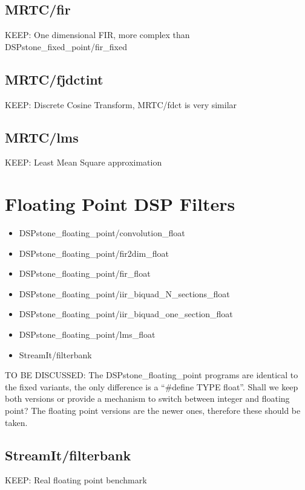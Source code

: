 \documentclass[a4paper]{article}
\begin{document}
\subsection{MRTC/fir}
	KEEP: One dimensional FIR, more complex than DSPstone\_fixed\_point/fir\_fixed
\subsection{MRTC/fjdctint}
	KEEP: Discrete Cosine Transform, MRTC/fdct is very similar
\subsection{MRTC/lms}
	KEEP: Least Mean Square approximation




\section{Floating Point DSP Filters}

\begin{itemize}
	\item DSPstone\_floating\_point/convolution\_float
	\item DSPstone\_floating\_point/fir2dim\_float
	\item DSPstone\_floating\_point/fir\_float
	\item DSPstone\_floating\_point/iir\_biquad\_N\_sections\_float
	\item DSPstone\_floating\_point/iir\_biquad\_one\_section\_float
	\item DSPstone\_floating\_point/lms\_float
	\item StreamIt/filterbank
\end{itemize}
	TO BE DISCUSSED: The DSPstone\_floating\_point programs are identical to
	the fixed variants, the only difference is a ``\#define TYPE float''.
	Shall we keep both versions or provide a mechanism to switch between
	integer and floating point? The floating point versions are the newer
	ones, therefore these should be taken.

\subsection{StreamIt/filterbank}
	KEEP: Real floating point benchmark

    
\end{document}
